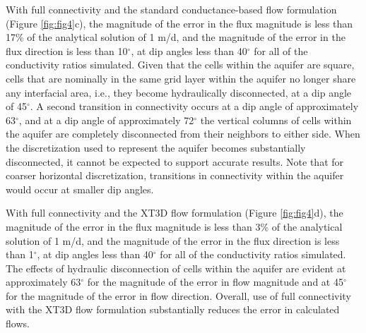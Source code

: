 \documentclass{article}
\begin{document}
With full connectivity and the standard conductance-based flow formulation (Figure \ref{fig:fig4}c), the magnitude of the error in the flux magnitude is less than 17\% of the analytical solution of 1 m/d, and the magnitude of the error in the flux direction is less than 10$^{\circ}$, at dip angles less than 40$^{\circ}$ for all of the conductivity ratios simulated. Given that the cells within the aquifer are square, cells that are nominally in the same grid layer within the aquifer no longer share any interfacial area, i.e., they become hydraulically disconnected, at a dip angle of 45$^{\circ}$. A second transition in connectivity occurs at a dip angle of approximately 63$^{\circ}$, and at a dip angle of approximately 72$^{\circ}$ the vertical columns of cells within the aquifer are completely disconnected from their neighbors to either side. When the discretization used to represent the aquifer becomes substantially disconnected, it cannot be expected to support accurate results. Note that for coarser horizontal discretization, transitions in connectivity within the aquifer would occur at smaller dip angles.

With full connectivity and the XT3D flow formulation (Figure \ref{fig:fig4}d), the magnitude of the error in the flux magnitude is less than 3\% of the analytical solution of 1 m/d, and the magnitude of the error in the flux direction is less than 1$^{\circ}$, at dip angles less than 40$^{\circ}$ for all of the conductivity ratios simulated. The effects of hydraulic disconnection of cells within the aquifer are evident at approximately 63$^{\circ}$ for the magnitude of the error in flow magnitude and at 45$^{\circ}$  for the magnitude of the error in flow direction. Overall, use of full connectivity with the XT3D flow formulation substantially reduces the error in calculated flows.
\end{document}
